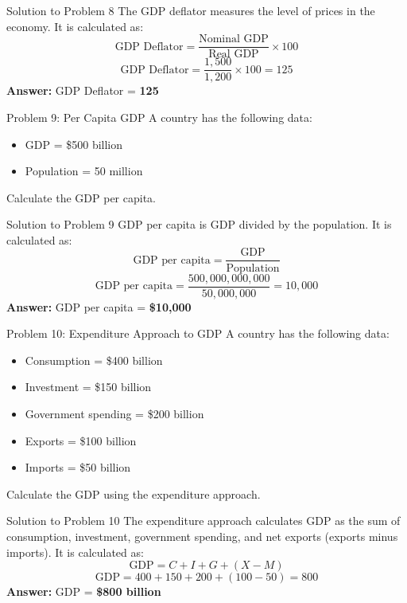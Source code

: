 \documentclass{beamer}
\begin{document}
\begin{frame}{Solution to Problem 8}
The GDP deflator measures the level of prices in the economy. It is calculated as:
\[
\text{GDP Deflator} = \frac{\text{Nominal GDP}}{\text{Real GDP}} \times 100
\]
\[
\text{GDP Deflator} = \frac{1,500}{1,200} \times 100 = 125
\]
\textbf{Answer:} GDP Deflator = \textbf{125}
\end{frame}

\begin{frame}{Problem 9: Per Capita GDP}
A country has the following data:
\begin{itemize}
    \item GDP = \$500 billion
    \item Population = 50 million
\end{itemize}
Calculate the GDP per capita.
\end{frame}

\begin{frame}{Solution to Problem 9}
GDP per capita is GDP divided by the population. It is calculated as:
\[
\text{GDP per capita} = \frac{\text{GDP}}{\text{Population}}
\]
\[
\text{GDP per capita} = \frac{500,000,000,000}{50,000,000} = 10,000
\]
\textbf{Answer:} GDP per capita = \textbf{\$10,000}
\end{frame}

\begin{frame}{Problem 10: Expenditure Approach to GDP}
A country has the following data:
\begin{itemize}
    \item Consumption = \$400 billion
    \item Investment = \$150 billion
    \item Government spending = \$200 billion
    \item Exports = \$100 billion
    \item Imports = \$50 billion
\end{itemize}
Calculate the GDP using the expenditure approach.
\end{frame}

\begin{frame}{Solution to Problem 10}
The expenditure approach calculates GDP as the sum of consumption, investment, government spending, and net exports (exports minus imports). It is calculated as:
\[
\text{GDP} = C + I + G + (X - M)
\]
\[
\text{GDP} = 400 + 150 + 200 + (100 - 50) = 800
\]
\textbf{Answer:} GDP = \textbf{\$800 billion}
\end{frame}
\end{document}
